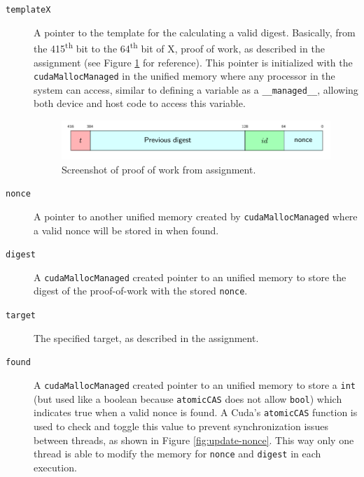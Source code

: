 \documentclass[a4paper]{article}
\begin{document}
\begin{description}
\item[{\texttt{templateX}}]A pointer to the template for the calculating a valid digest. Basically, from the 415\textsuperscript{th} bit to the 64\textsuperscript{th} bit of X, proof of work, as described in the assignment (see Figure \ref{fig:proof-of-work} for reference). This pointer is initialized with the \texttt{cudaMallocManaged} in the unified memory where any processor in the system can access, similar to defining a variable as a \texttt{\_\_managed\_\_}, allowing both device and host code to access this variable.
\begin{figure}
\includegraphics[width=1\textwidth]{Screenshot_3.png}
\caption{\label{fig:proof-of-work}Screenshot of proof of work from assignment.}
\end{figure}

\item[{\texttt{nonce}}]A pointer to another unified memory created by \texttt{cudaMallocManaged} where a valid nonce will be stored in when found. 

\item[{\texttt{digest}}]A \texttt{cudaMallocManaged} created pointer to an unified memory to store the digest of the proof-of-work with the stored \texttt{nonce}.

\item[{\texttt{target}}]The specified target, as described in the assignment.

\item[{\texttt{found}}]A \texttt{cudaMallocManaged} created pointer to an unified memory to store a \texttt{int} (but used like a boolean because \texttt{atomicCAS} does not allow \texttt{bool}) which indicates true when a valid nonce is found. A Cuda's \texttt{atomicCAS} function is used to check and toggle this value to prevent synchronization issues between threads, as shown in Figure \ref{fig:update-nonce}. This way only one thread is able to modify the memory for \texttt{nonce} and \texttt{digest} in each execution.
\end{description}
\end{document}
